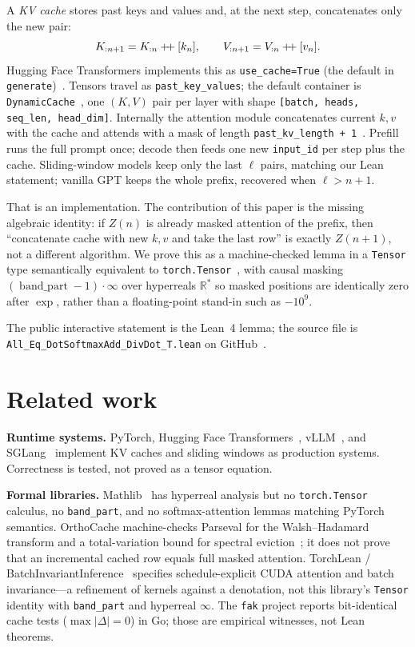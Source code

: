 \documentclass[11pt,a4paper]{article}
\newcommand{\bandpart}{\operatorname{band\_part}}
\newcommand{\concat}{\mathbin{+\mkern-4mu+}}
\newcommand{\Rstar}{\mathbb{R}^*}
\begin{document}
A \emph{KV cache} stores past keys and values and, at the next step, concatenates only the new pair:
\[
K_{:n+1}=K_{:n}\concat[k_n],\qquad V_{:n+1}=V_{:n}\concat[v_n].
\]
Hugging Face Transformers implements this as \texttt{use\_cache=True} (the default in \texttt{generate})~\cite{huggingface_generate}.
Tensors travel as \texttt{past\_key\_values}; the default container is \texttt{DynamicCache}~\cite{huggingface_dynamic_cache}, one $(K,V)$ pair per layer with shape \texttt{[batch, heads, seq\_len, head\_dim]}.
Internally the attention module concatenates current $k,v$ with the cache and attends with a mask of length \texttt{past\_kv\_length + 1}~\cite{huggingface_kv_cache}.
Prefill runs the full prompt once; decode then feeds one new \texttt{input\_id} per step plus the cache.
Sliding-window models keep only the last $\ell$ pairs, matching our Lean statement; vanilla GPT keeps the whole prefix, recovered when $\ell>n+1$.

That is an implementation.
The contribution of this paper is the missing algebraic identity: if $Z(n)$ is already masked attention of the prefix, then ``concatenate cache with new $k,v$ and take the last row'' is exactly $Z(n{+}1)$, not a different algorithm.
We prove this as a machine-checked lemma in a \texttt{Tensor} type semantically equivalent to \texttt{torch.Tensor}~\cite{lemma_repo}, with causal masking $(\bandpart-1)\cdot\infty$ over hyperreals $\Rstar$ so masked positions are identically zero after $\exp$, rather than a floating-point stand-in such as $-10^9$.

The public interactive statement is the Lean~4 lemma; the source file is
\texttt{All\_Eq\_DotSoftmaxAdd\_DivDot\_T.lean} on GitHub~\cite{lemma_repo}.

\section{Related work}
\label{sec:related}

\textbf{Runtime systems.}
PyTorch, Hugging Face Transformers~\cite{huggingface_kv_cache}, vLLM~\cite{vllm}, and SGLang~\cite{sglang} implement KV caches and sliding windows as production systems.
Correctness is tested, not proved as a tensor equation.

\textbf{Formal libraries.}
Mathlib~\cite{mathlib_hyperreal} has hyperreal analysis but no \texttt{torch.Tensor} calculus, no \texttt{band\_part}, and no softmax-attention lemmas matching PyTorch semantics.
OrthoCache machine-checks Parseval for the Walsh--Hadamard transform and a total-variation bound for spectral eviction~\cite{orthocache}; it does not prove that an incremental cached row equals full masked attention.
TorchLean / BatchInvariantInference~\cite{torchlean} specifies schedule-explicit CUDA attention and batch invariance---a refinement of kernels against a denotation, not this library's \texttt{Tensor} identity with \texttt{band\_part} and hyperreal $\infty$.
The \texttt{fak} project reports bit-identical cache tests ($\max|\Delta|=0$) in Go; those are empirical witnesses, not Lean theorems.
\end{document}
